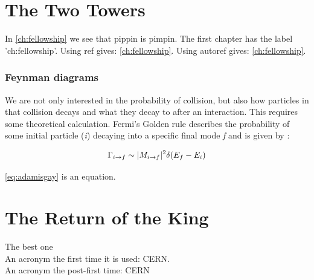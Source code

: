 \chapter{The Two Towers} \label{ch:towers}
In \autoref{ch:fellowship} we see that pippin is pimpin.
The first chapter has the label 'ch:fellowship'.
Using ref gives: \ref{ch:fellowship}. Using autoref gives: \autoref{ch:fellowship}.

\subsection{Feynman diagrams} \label{sec:Feynman}
We are not only interested in the probability of collision, but also how particles in that collision decays
and what they decay to after an interaction.
This requires some theoretical calculation. Fermi's Golden rule describes the probability of some initial particle (\textit{i}) decaying
into a specific final mode \textit{f} and is given by \citep{schwartz:2006}:
\begin{ceqn}\begin{align} \label{eq:adamisgay}
  \centering
  \Gamma_{i \rightarrow f} \sim |M_{i \rightarrow f}|^2 \delta(E_f-E_i)
\end{align}\end{ceqn}
\autoref{eq:adamisgay} is an equation.

\chapter{The Return of the King} \label{ch:king}
The best one \\

An acronym the first time it is used: \ac{CERN}.\\
An acronym the post-first time: \ac{CERN}
